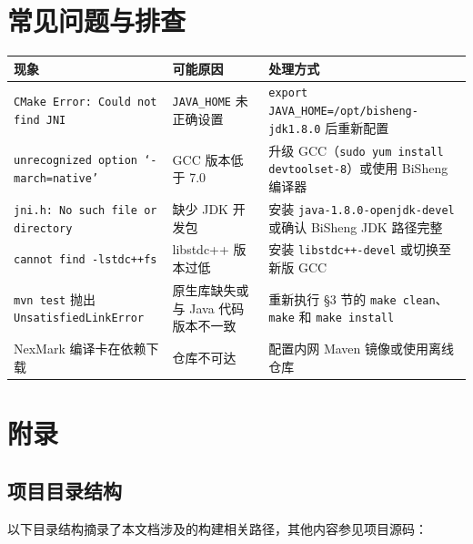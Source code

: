 \documentclass[a4paper,11pt]{article}
\begin{document}
\section{常见问题与排查}

\begin{table}[H]
\centering
\small
\begin{tabularx}{\textwidth}{L{4.8cm} L{3.2cm} X}
\toprule
\textbf{现象} & \textbf{可能原因} & \textbf{处理方式} \\
\midrule
\texttt{CMake Error: Could not find JNI} & \texttt{JAVA\_HOME} 未正确设置 & \nolinkurl{export JAVA_HOME=/opt/bisheng-jdk1.8.0} 后重新配置 \\
\texttt{unrecognized option `-march=native'} & GCC 版本低于 7.0 & 升级 GCC（\texttt{sudo yum install devtoolset-8}）或使用 BiSheng 编译器 \\
\texttt{jni.h: No such file or directory} & 缺少 JDK 开发包 & 安装 \nolinkurl{java-1.8.0-openjdk-devel} 或确认 BiSheng JDK 路径完整 \\
\texttt{cannot find -lstdc++fs} & libstdc++ 版本过低 & 安装 \texttt{libstdc++-devel} 或切换至新版 GCC \\
\texttt{mvn test} 抛出 \texttt{UnsatisfiedLinkError} & 原生库缺失或与 Java 代码版本不一致 & 重新执行 \S3 节的 \texttt{make clean}、\texttt{make} 和 \texttt{make install} \\
 NexMark 编译卡在依赖下载 & 仓库不可达 & 配置内网 Maven 镜像或使用离线仓库 \\
\bottomrule
\end{tabularx}
\end{table}

\section{附录}

\subsection{项目目录结构}

以下目录结构摘录了本文档涉及的构建相关路径，其他内容参见项目源码：
\end{document}
